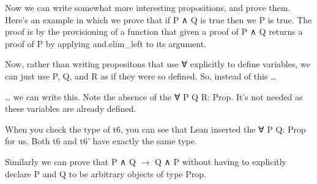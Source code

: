 \documentclass[letterpaper,10pt,english]{sphinxmanual}
\begin{document}
Now we can write somewhat more interesting propositions, and prove
them. Here’s an example in which we prove that if P ∧ Q is true then
we P is true. The proof is by the provisioning of a function that
given a proof of P ∧ Q returns a proof of P by applying and.elim\_left
to its argument.

Now, rather than writing propositons that use ∀ explicitly to define
variables, we can just use P, Q, and R as if they were so defined. So,
instead of this …

\begin{sphinxVerbatim}[commandchars=\\\{\}]
           
           
\end{sphinxVerbatim}

… we can write this. Note the absence of the ∀ P Q R: Prop. It’s not
needed as these variables are already defined.

\begin{sphinxVerbatim}[commandchars=\\\{\}]
       
        
\end{sphinxVerbatim}

When you check the type of t6, you can see that Lean inserted the ∀ P
Q: Prop for us.  Both t6 and t6’ have exactly the same type.

\begin{sphinxVerbatim}[commandchars=\\\{\}]
 
 
\end{sphinxVerbatim}

Similarly we can prove that P ∧ Q \(\rightarrow\) Q ∧ P without having to explicitly
declare P and Q to be arbitrary objects of type Prop.
\end{document}
